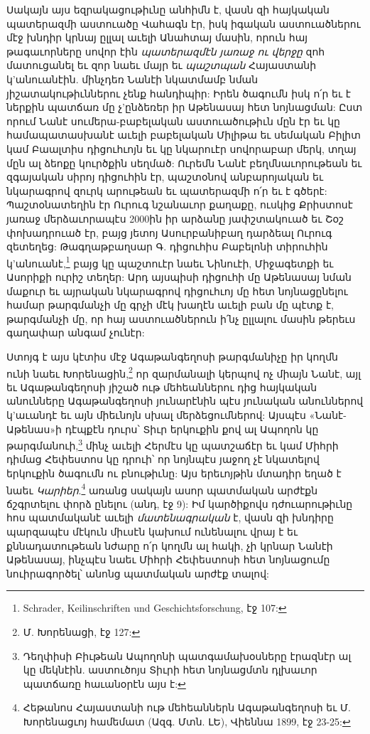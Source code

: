 \documentclass{article}
\begin{document}
{Սակայն այս եզրակացութիւնը անհիմն է, վասն զի հայկական պատերազմի աստուածը Վահագն էր, իսկ իգական աստուածներու մէջ խնդիր կրնայ ըլլալ աւելի Անահտայ մասին, որուն հայ թագաւորները սովոր էին \emph{պատերազմէն յառաջ ու վերջը} զոհ մատուցանել եւ զոր նաեւ մայր եւ \emph{պաշտպան} Հայաստանի կ'անուանէին. մինչդեռ Նանէի նկատմամբ նման յիշատակութիւններու չենք հանդիպիր: Իրեն ծագումն իսկ ո՛ր եւ է ներքին պատճառ մը չ'ընձեռեր իր Աթենասայ հետ նոյնացման: Ըստ որում Նանէ սումերա-բաբելական աստուածութիւն մըն էր եւ կը համապատասխանէ աւելի բաբելական Միլիթա եւ սեմական Բիլիտ կամ Բաալտիս դիցուհւոյն եւ կը նկարուէր սովորաբար մերկ, տղայ մըն ալ ձեոքը կուրծքին սեղմած: Ուրեմն Նանէ բեղմնաւորութեան եւ զգայական սիրոյ դիցուհին էր, պաշտօնով անբարոյական եւ նկարագրով զուրկ արութեան եւ պատերազմի ո՛ր եւ է գծերէ: Պաշտօնատեղին էր Ուրուգ նշանաւոր քաղաքը, ուսկից Քրիստոսէ յառաջ մերձաւորապէս 2000ին իր արձանը յափշտակուած եւ Շօշ փոխադրուած էր, բայց յետոյ Ասուրբանիբաղ դարձեալ Ուրուգ զետեղեց: Թագղաթբաղսար Գ. դիցուհիս Բաբելոնի տիրուհին կ'անուանէ,\footnote{Schrader, Keilinschriften und Geschichtsforschung, էջ 107:} բայց կը պաշտուէր նաեւ Նինուէի, Միջագետքի եւ Ասորիքի ուրիշ տեղեր: Արդ այսպիսի դիցուհի մը Աթենասայ նման մաքուր եւ այրական նկարագրով դիցուհւոյ մը հետ նոյնացընելու համար թարգմանչի մը գրչի մէկ խաղէն աւելի բան մը պէտք է, թարգմանչի մը, որ հայ աստուածներուն ի՛նչ ըլլալու մասին թերեւս գաղափար անգամ չունէր:

Ստոյգ է այս կէտիս մէջ Ագաթանգեղոսի թարգմանիչը իր կողմն ունի նաեւ Խորենացին,\footnote{Մ. Խորենացի, էջ 127:} որ զարմանալի կերպով ոչ միայն Նանէ, այլ եւ Ագաթանգեղոսի յիշած ութ մեհեաններու դից հայկական անունները Ագաթանգեղոսի յունարէնին պէս յունական անուններով կ'աւանդէ եւ այն միեւնոյն սխալ մերձեցումներով: Այսպէս «Նանէ-Աթենաս»ի դէպքէն դուրս՝ Տիւր երկուքին քով ալ Ապողոն կը թարգմանուի,\footnote{Դեղփիսի Բիւթեան Ապողոնի պատգամախօսները էրազնէր ալ կը մեկնէին. աստուծոյս Տիւրի հետ նոյնացմտն դլխաւոր պատճառը հաւանօրէն այս է:} մինչ աւելի Հերմէս կը պատշաճէր եւ կամ Միհրի դիմաց Հեփեստոս կը դրուի՝ որ նոյնպէս յաջող չէ նկատելով երկուքին ծագումն ու բնութիւնը: Այս երեւոյթին մտադիր եղած է նաեւ \emph{Կարիեր}.\footnote{Հեթանոս Հայաստանի ութ մեհեաններն Ագաթանգեղոսի եւ Մ. Խորենացւոյ համեմատ (Ազգ. Մտն. ԼԵ), Վիեննա 1899, էջ 23-25:} առանց սակայն ասոր պատմական արժէքն ճշգրտելու փորձ ընելու (անդ, էջ 9): Իմ կարծիքովս դժուարութիւնը հոս պատմականէ աւելի \emph{մատենագրական} է, վասն զի խնդիրը պարզապէս մէկուն միւսէն կախում ունենալու վրայ է եւ քննադատութեան նժարը ո՛ր կողմն ալ հակի, չի կրնար Նանէի Աթենասայ, ինչպէս նաեւ Միհրի Հեփեստոսի հետ նոյնացումը նուիրագործել՝ անոնց պատմական արժէք տալով:

}
\end{document}
